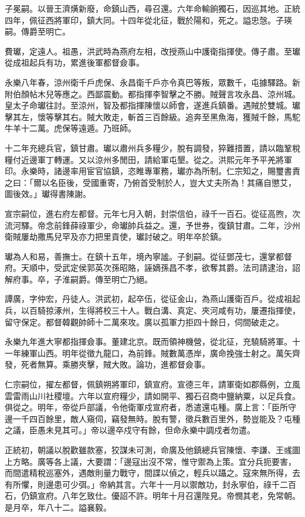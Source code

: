 \begin{pinyinscope}
子冕嗣。以晉王濟熿新廢，命鎮山西，尋召還。六年命輸餉獨石，因巡其地。正統四年，佩征西將軍印，鎮大同。十四年從北征，戰於陽和，死之。謚忠愨。子瑛嗣。傳爵至明亡。

費瓛，定遠人。祖愚，洪武時為燕府左相，改授燕山中護衛指揮使。傳子肅。至瓛從成祖起兵有功，累進後軍都督僉事。

永樂八年春，涼州衛千戶虎保、永昌衛千戶亦令真巴等叛，眾數千，屯據驛路。新附伯顏帖木兒等應之。西鄙震動。都指揮李智擊之不勝。賊聲言攻永昌、涼州城。皇太子命瓛往討。至涼州，智及都指揮陳懷以師會，遂進兵鎮番。遇賊於雙城。瓛擊其左，懷等擊其右。賊大敗走，斬首三百餘級。追奔至黑魚海，獲賊千餘，馬駝牛羊十二萬。虎保等遠遁。乃班師。

十二年充總兵官，鎮甘肅。瓛以肅州兵多糧少，脫有調發，猝難措置，請以臨鞏稅糧付近邊軍丁轉運。又以涼州多閒田，請給軍屯墾。從之。洪熙元年予平羌將軍印。永樂時，諸邊率用宦官協鎮，恣睢專軍務，瓛亦為所制。仁宗知之，賜璽書責之曰：「爾以名臣後，受國重寄，乃俯首受制於人，豈大丈夫所為！其痛自懲艾，圖後效。」瓛得書陳謝。

宣宗嗣位，進右府左都督。元年七月入朝，封崇信伯，祿千一百石。從征高煦，次流河驛。帝念前鋒薛祿軍少，命瓛帥兵益之。還，予世券，復鎮甘肅。二年，沙州衛賊屢劫撒馬兒罕及亦力把里貢使，瓛討破之。明年卒於鎮。

瓛為人和易，善撫士。在鎮十五年，境內寧謐。子釗嗣。從征鄧茂七，還掌都督府。天順中，受武定侯郭英次孫昭賂，誣嫡孫昌不孝，欲奪其爵。法司請逮治，詔解府事。卒，子淮嗣爵。傳至明亡乃絕。

譚廣，字仲宏，丹徒人。洪武初，起卒伍，從征金山，為燕山護衛百戶。從成祖起兵，以百騎掠涿州，生得將校三十人。戰白溝、真定、夾河咸有功，屢遷指揮使，留守保定。都督韓觀帥師十二萬來攻。廣以孤軍力拒四十餘日，伺間破走之。

永樂九年進大寧都指揮僉事。董建北京。既而領神機營，從北征，充驍騎將軍。十一年練軍山西。明年從徵九龍口，為前鋒。賊數萬憑岸，廣命挽強士射之。萬矢齊發，死者無算。乘勝夾擊，賊大敗。論功，進都督僉事。

仁宗嗣位，擢左都督，佩鎮朔將軍印，鎮宣府。宣德三年，請軍衛如郡縣例，立風雲雷雨山川社稷壇。六年以宣府糧少，請如開平、獨石召商中鹽納粟，以足兵食。俱從之。明年，帝從戶部議，令他衛軍戍宣府者，悉遣還屯種。廣上言：「臣所守邊一千四百餘里，敵人窺伺，竊發無時。脫有警，徵兵數百里外，勢豈能及？屯種之議，臣愚未見其可。」帝以邊卒戍守有餘，但命永樂中調戍者勿遣。

正統初，朝議以脫歡雖款塞，狡謀未可測，命廣及他鎮總兵官陳懷、李謙、王彧圖上方略。廣等各上議，大要謂：「邊寇出沒不常，惟守禦為上策。宜分兵扼要害，而間遣精稅巡塞外，遇敵則量力戰守，間諜以偵之，輕兵以躡之。寇來無所得，去有所懼，則邊患可少弭。」帝納其言。六年十一月以禦敵功，封永寧伯，祿千二百石，仍鎮宣府。八年乞致仕。優詔不許。明年十月召還陛見。帝憫其老，免常朝。是月卒，年八十二。謚襄毅。


\end{pinyinscope}
